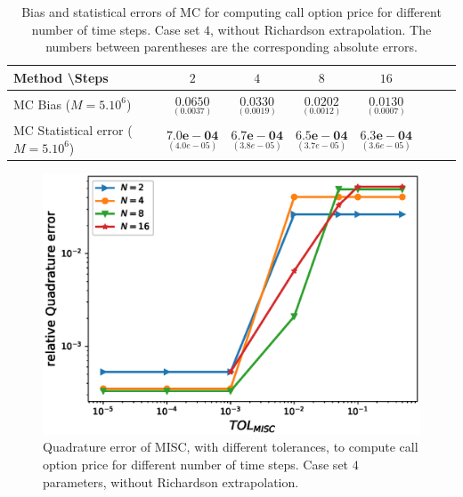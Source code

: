 \FloatBarrier
\begin{table}[h!]
	\centering
	\begin{tabular}{l*{6}{c}r}
		Method \textbackslash  Steps            & $2$ & $4$ & $8$ & $16$  \\
		\hline
		MC Bias ($M=5.10^6$)   & 	$ \underset{(0.0037
			)}{\mathbf{0.0650}}$  & $\underset{(0.0019)}{\mathbf{0.0330
		}}$  & $\underset{(0.0012)}{\mathbf{0.0202}}$ & $\underset{(0.0007)}{\mathbf{0.0130}}$\\ 
		
		MC Statistical error ($M=5.10^6$)  &  $\underset{(   4.0e-05)} {\mathbf{7.0e-04}}$  & $\underset{(3.8e-05)} {\mathbf{6.7e-04}}$  & $\underset{(3.7e-05)} {\mathbf{6.5e-04 }}$ & $\underset{(3.6e-05)} {\mathbf{6.3e-04}}$	\\
		
		\hline
	\end{tabular}
	\caption{Bias and statistical errors of MC   for computing call option price  for different number of time steps. Case set $4$, without Richardson extrapolation. The numbers between parentheses are the corresponding absolute errors.}
	\label{Bias and Statistical errors of MC ($M=5.10^6$)  for computing Call option price  for different number of time steps. Case set 5, without Richardson extrapolation. The numbers between parentheses are the corresponding absolute errors.}
\end{table}
%
%
%


\FloatBarrier





\begin{figure}[h!]
	\centering
	\includegraphics[width=0.35\linewidth]{./figures/rBergomi_MISC_quadratre_error/vs_TOL/set7/relative_quad_error_wrt_MISC_TOL_set7_non_rich}
	
	
	\caption{Quadrature error of MISC, with  different tolerances,  to compute call option price  for different number of time steps. Case  set $4$ parameters, without Richardson extrapolation. }
	\label{fig:Quadrature_error_set5}
\end{figure}


